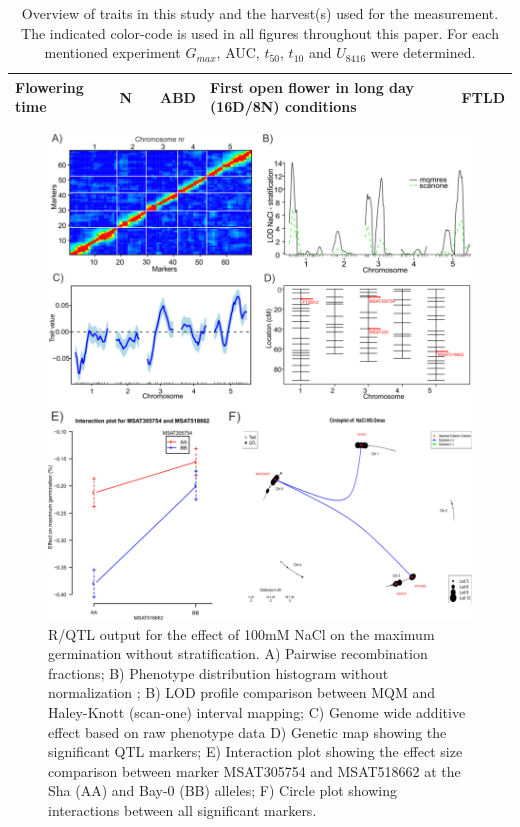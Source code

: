 \begin{table}[h]
\begin{tabular}{ | l | c | l | l | p{4cm} | l | }
    Flowering time            & N & & ABD           & First open flower in long day (16D/8N) conditions                                                                        & FTLD                      \\
    \hline
  \end{tabular}
  \caption[Trait codes]{Overview of traits in this study and the harvest(s) used for the measurement. The indicated color-code 
          is used in all figures throughout this paper. For each mentioned experiment $G_{max}$, AUC, $t_{50}$, $t_{10}$ and $U_{8416}$ were determined.}
\end{table}

\begin{figure}[h!]
  \centering
  \includegraphics[keepaspectratio,scale=0.30]{eps/image_3_1_2.eps}
  \caption[Generated Output.]{R/QTL output for the effect of 100mM NaCl on the maximum germination without 
          stratification. A) Pairwise recombination fractions; B) Phenotype distribution histogram without 
          normalization ; B) LOD profile comparison between MQM and Haley-Knott (scan-one) interval mapping; 
          C) Genome wide additive effect based on raw phenotype data D) Genetic map showing the significant 
          QTL markers; E) Interaction plot showing the effect size comparison between marker MSAT305754 and 
          MSAT518662 at the Sha (AA) and Bay-0 (BB) alleles; F) Circle plot showing interactions between 
          all significant markers.}
          \label{fig:generatedoutput}
\end{figure}

